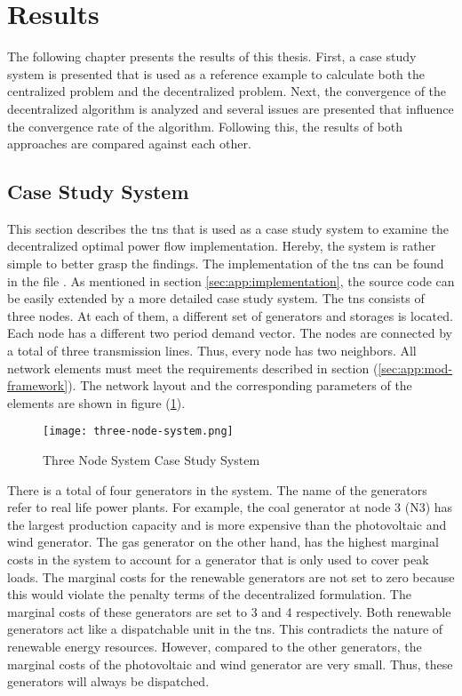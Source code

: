 \section{Results}
\label{sec:res}

The following chapter presents the results of this thesis. First, a case study system is presented that is used as a reference example to calculate both the centralized problem and the decentralized problem. Next, the convergence of the decentralized algorithm is analyzed and several issues are presented that influence the convergence rate of the algorithm. Following this, the results of both approaches are compared against each other.

\subsection{Case Study System}
\label{sec:res:tns}

This section describes the \gls{tns} that is used as a case study system to examine the decentralized optimal power flow implementation. Hereby, the system is rather simple to better grasp the findings. The implementation of the \gls{tns} can be found in the file . As mentioned in section \ref{sec:app:implementation}, the source code can be easily extended by a more detailed case study system. The \gls{tns} consists of three nodes. At each of them, a different set of generators and storages is located. Each node has a different two period demand vector. The nodes are connected by a total of three transmission lines. Thus, every node has two neighbors. All network elements must meet the requirements described in section (\ref{sec:app:mod-framework}). The network layout and the corresponding parameters of the elements are shown in figure (\ref{fig:tns}).

\begin{figure}[h]
	\centering
	\texttt{[image: three-node-system.png]}
	\caption{Three Node System Case Study System}
	\label{fig:tns}
\end{figure}

There is a total of four generators in the system. The name of the generators refer to real life power plants. For example, the coal generator at node 3 (N3) has the largest production capacity and is more expensive than the photovoltaic and wind generator. The gas generator on the other hand, has the highest marginal costs in the system to account for a generator that is only used to cover peak loads. The marginal costs for the renewable generators are not set to zero because this would violate the penalty terms of the decentralized formulation. The marginal costs of these generators are set to 3 and 4 respectively. Both renewable generators act like a dispatchable unit in the \gls{tns}. This contradicts the nature of renewable energy resources. However, compared to the other generators, the marginal costs of the photovoltaic and wind generator are very small. Thus, these generators will always be dispatched.

